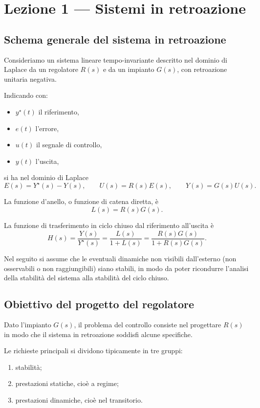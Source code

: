 \chapter{Lezione 1 --- Sistemi in retroazione}

\section{Schema generale del sistema in retroazione}

Consideriamo un sistema lineare tempo-invariante descritto nel dominio di Laplace
da un regolatore \(R(s)\) e da un impianto \(G(s)\), con retroazione unitaria negativa.

Indicando con:
\begin{itemize}
    \item \(y^\star(t)\) il riferimento,
    \item \(e(t)\) l'errore,
    \item \(u(t)\) il segnale di controllo,
    \item \(y(t)\) l'uscita,
\end{itemize}
si ha nel dominio di Laplace
\[
E(s)=Y^\star(s)-Y(s),
\qquad
U(s)=R(s)E(s),
\qquad
Y(s)=G(s)U(s).
\]

La funzione d'anello, o funzione di catena diretta, è
\[
L(s)=R(s)G(s).
\]

La funzione di trasferimento in ciclo chiuso dal riferimento all'uscita è
\[
H(s)=\frac{Y(s)}{Y^\star(s)}=\frac{L(s)}{1+L(s)}=\frac{R(s)G(s)}{1+R(s)G(s)}.
\]

Nel seguito si assume che le eventuali dinamiche non visibili dall'esterno
(non osservabili o non raggiungibili) siano stabili, in modo da poter
ricondurre l'analisi della stabilità del sistema alla stabilità del ciclo chiuso.

\section{Obiettivo del progetto del regolatore}

Dato l'impianto \(G(s)\), il problema del controllo consiste nel progettare \(R(s)\)
in modo che il sistema in retroazione soddisfi alcune specifiche.

Le richieste principali si dividono tipicamente in tre gruppi:
\begin{enumerate}
    \item stabilità;
    \item prestazioni statiche, cioè a regime;
    \item prestazioni dinamiche, cioè nel transitorio.
\end{enumerate}

